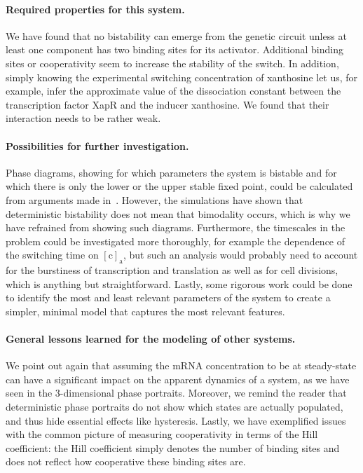 \documentclass[10pt,letterpaper]{article}
\newcommand{\n}[1]{\mathrm{#1}}
\begin{document}
\paragraph*{Required properties for this system.}
We have found that no bistability can emerge from the genetic circuit unless
at least one component has two binding sites for its activator. Additional
binding sites or cooperativity seem to increase the stability of the switch.
In addition, simply knowing the experimental switching concentration of
xanthosine let us, for example, infer the approximate value of the
dissociation constant between the transcription factor XapR and the inducer
xanthosine. We found that their interaction needs to be rather weak.

\paragraph*{Possibilities for further investigation.}
Phase diagrams, showing for which parameters the system is bistable and for
which there is only the lower or the upper stable fixed point, could be
calculated from arguments made in~\cite{Cherry2000}. However, the
simulations have shown that deterministic bistability does not mean that
bimodality occurs, which is why we have refrained from showing such
diagrams. Furthermore, the timescales in the problem could be investigated
more thoroughly, for example the dependence of the switching time on
$\n{[c]_a}$, but such an analysis would probably need to
account for the burstiness of transcription and translation as well as for
cell divisions, which is anything but straightforward. Lastly, some rigorous
work could be done to identify the most and least relevant parameters of the
system to create a simpler, minimal model that captures the most relevant
features.

\paragraph*{General lessons learned for the modeling of other systems.}
We point out again that assuming the mRNA concentration to be at
steady-state can have a significant impact on the apparent dynamics of a
system, as we have seen in the 3-dimensional phase portraits. Moreover, we
remind the reader that deterministic phase portraits do not show which
states are actually populated, and thus hide essential effects like
hysteresis. Lastly, we have exemplified issues with the common picture of
measuring cooperativity in terms of the Hill coefficient: the Hill
coefficient simply denotes the number of binding sites and does not reflect
how cooperative these binding sites are. 
\end{document}
